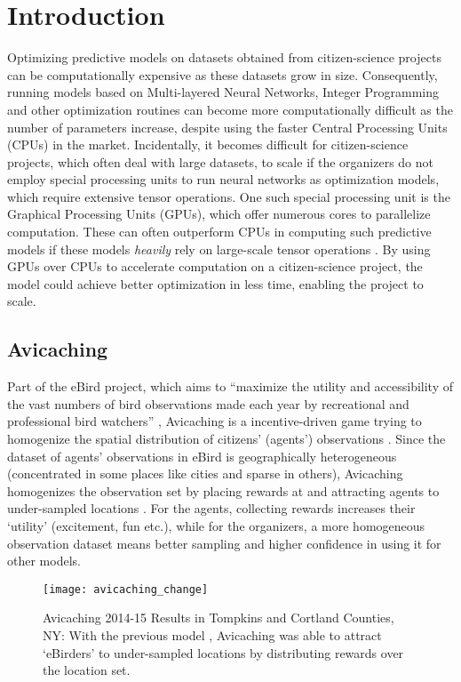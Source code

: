 \chapter{Introduction} \label{sec:Introduction}
Optimizing predictive models on datasets obtained from citizen-science projects can be computationally expensive as these datasets grow in size. Consequently, running models based on Multi-layered Neural Networks, Integer Programming and other optimization routines can become more computationally difficult as the number of parameters increase, despite using the faster Central Processing Units (CPUs) in the market. Incidentally, it becomes difficult for citizen-science projects, which often deal with large datasets, to scale if the organizers do not employ special processing units to run neural networks as optimization models, which require extensive tensor operations. One such special processing unit is the Graphical Processing Units (GPUs), which offer numerous cores to parallelize computation. These can often outperform CPUs in computing such predictive models if these models \textit{heavily} rely on large-scale tensor operations \cite{ParallelNVIDIA, cuDNNPaper}. By using GPUs over CPUs to accelerate computation on a citizen-science project, the model could achieve better optimization in less time, enabling the project to scale.

\section{Avicaching} \label{sec:Avicaching}
Part of the eBird project, which aims to ``maximize the utility and accessibility of the vast numbers of bird observations made each year by recreational and professional bird watchers'' \cite{EBird}, Avicaching is a incentive-driven game trying to homogenize the spatial distribution of citizens' (agents') observations \cite{Xue2016Avi1, Xue2016Avi2}. Since the dataset of agents' observations in eBird is geographically heterogeneous (concentrated in some places like cities and sparse in others), Avicaching homogenizes the observation set by placing rewards at and attracting agents to under-sampled locations \cite{Xue2016Avi1}. For the agents, collecting rewards increases their `utility' (excitement, fun etc.), while for the organizers, a more homogeneous observation dataset means better sampling and higher confidence in using it for other models. 
\begin{figure}[!htbp]
    \centering
    \texttt{[image: avicaching\_change]}
    \caption[Avicaching 2014-15 Results in Tompkins and Cortland Counties]{Avicaching 2014-15 Results in Tompkins and Cortland Counties, NY: With the previous model \cite{Xue2016Avi1, Xue2016Avi2, EBird}, Avicaching was able to attract `eBirders' to under-sampled locations by distributing rewards over the location set.}
    \label{fig:Avicaching 2014-15 Results in Tompkins and Cortland Counties}
\end{figure}

